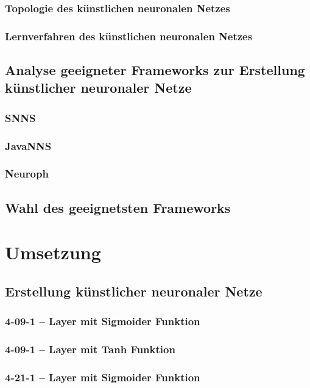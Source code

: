 \documentclass[11pt,a4paper]{scrreprt}
\begin{document}
		\subsection{Topologie des künstlichen neuronalen Netzes} %
		\subsection{Lernverfahren des künstlichen neuronalen Netzes} %
	\section{Analyse geeigneter Frameworks zur Erstellung künstlicher neuronaler Netze} %
		\subsection{SNNS} %
	  \subsection{JavaNNS}  %
		\subsection{Neuroph} %
	\section{Wahl des geeignetsten Frameworks} %
	
\chapter{Umsetzung} %
	\section{Erstellung künstlicher neuronaler Netze} %
	 \subsection{4-09-1 – Layer mit Sigmoider Funktion} %
	 \subsection{4-09-1 – Layer mit Tanh Funktion} %
	 \subsection{4-21-1 – Layer mit Sigmoider Funktion} %
\end{document}
